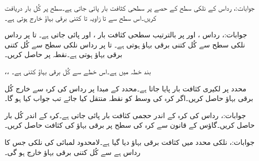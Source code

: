 جوابات:، 
رداس  کے نلکی سطح کے  حصے  پر سطحی کثافت بار  پائی جاتی ہے۔سطح پر کُل بار دریافت کریں۔اس سطح سے  تا  زاویہ  تا  کتنی برقی بہاؤ خارج ہوتی ہے۔

جوابات:، 
رداس ،  اور  پر بالترتیب سطحی کثافت بار ،  اور  پائی جاتی ہے۔  تا   پر رداس  نلکی سطح سے کُل کتنی برقی بہاؤ ہوتی ہے۔ تا   پر رداس  نلکی سطح سے کُل کتنی برقی بہاؤ ہوتی ہے۔نقطہ  پر  حاصل کریں۔

،،
بند خطہ  میں  ہے۔اس خطے سے کُل برقی بہاؤ کتنی ہے۔

محدد  پر لکیری کثافت بار  پایا جاتا ہے۔محدد کے مبدا پر رداس  کی کرہ سے خارج کُل برقی بہاؤ حاصل کریں۔اگر کرہ کی وسط کو نقطہ  منتقل کیا جائے تب جواب کیا ہو گا۔

جوابات:، 
رداس  کی کرہ کے اندر حجمی کثافت بار  پائی جاتی ہے۔کرہ کے اندر کُل بار حاصل کریں۔گاؤس کے قانون سے کرہ کی سطح پر برقی بہاؤ کی کثافت حاصل کریں۔

جوابات:، 
نلکی محدد میں کثافت برقی بہاؤ  دیا گیا ہے۔لامحدود لمبائی کی نلکی جس کا رداس  ہے سے کُل کتنی برقی بہاؤ خارج ہو گی۔

